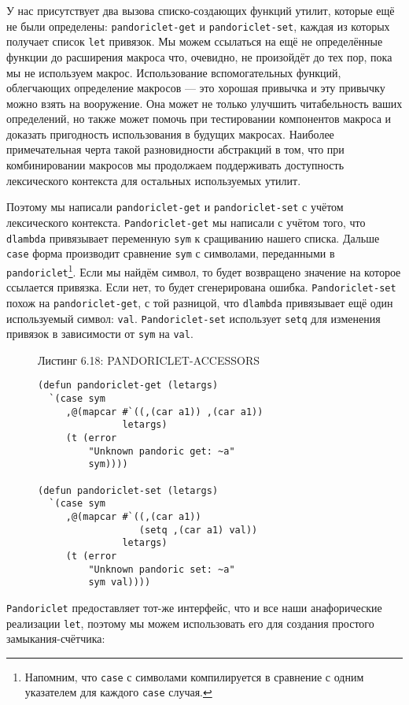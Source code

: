 У нас присутствует два вызова списко-создающих функций утилит, которые ещё не были определены: \verb"pandoriclet-get" и \verb"pandoriclet-set", каждая из которых получает список \verb"let" привязок. Мы можем ссылаться на ещё не определённые функции до расширения макроса что, очевидно, не произойдёт до тех пор, пока мы не используем макрос. Использование вспомогательных функций, облегчающих определение макросов --- это хорошая привычка и эту привычку можно взять на вооружение. Она может не только улучшить читабельность ваших определений, но также может помочь при тестировании компонентов макроса и доказать пригодность использования в будущих макросах. Наиболее примечательная черта такой разновидности абстракций в том, что при комбинировании макросов мы продолжаем поддерживать доступность лексического контекста для остальных используемых утилит.

Поэтому мы написали \verb"pandoriclet-get" и \verb"pandoriclet-set" с учётом лексического контекста. \verb"Pandoriclet-get" мы написали с учётом того, что \verb"dlambda" привязывает переменную \verb"sym" к сращиванию нашего списка. Дальше \verb"case" форма производит сравнение \verb"sym" с символами, переданными в \verb"pandoriclet"\footnote{Напомним, что \verb"case" с символами компилируется в сравнение с одним указателем для каждого \verb"case" случая.}. Если мы найдём символ, то будет возвращено значение на которое ссылается привязка. Если нет, то будет сгенерирована ошибка. \verb"Pandoriclet-set" похож на \verb"pandoriclet-get", с той разницой, что \verb"dlambda" привязывает ещё один используемый символ: \verb"val". \verb"Pandoriclet-set" использует \verb"setq" для изменения привязок в зависимости от \verb"sym" на \verb"val".



\begin{figure}Листинг 6.18: PANDORICLET-ACCESSORS\label{listing_6.18}
\listbegin
\begin{verbatim}
(defun pandoriclet-get (letargs)
  `(case sym
     ,@(mapcar #`((,(car a1)) ,(car a1))
               letargs)
     (t (error
         "Unknown pandoric get: ~a"
         sym))))

(defun pandoriclet-set (letargs)
  `(case sym
     ,@(mapcar #`((,(car a1))
                  (setq ,(car a1) val))
               letargs)
     (t (error
         "Unknown pandoric set: ~a"
         sym val))))
\end{verbatim}
\listend
\end{figure}

\verb"Pandoriclet" предоставляет тот-же интерфейс, что и все наши анафорические реализации \verb"let", поэтому мы можем использовать его для создания простого замыкания-счётчика:

